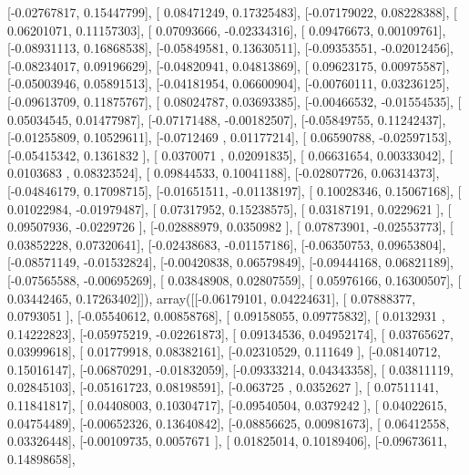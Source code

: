 \documentclass{article}
\begin{document}
       [-0.02767817,  0.15447799],
       [ 0.08471249,  0.17325483],
       [-0.07179022,  0.08228388],
       [ 0.06201071,  0.11157303],
       [ 0.07093666, -0.02334316],
       [ 0.09476673,  0.00109761],
       [-0.08931113,  0.16868538],
       [-0.05849581,  0.13630511],
       [-0.09353551, -0.02012456],
       [-0.08234017,  0.09196629],
       [-0.04820941,  0.04813869],
       [ 0.09623175,  0.00975587],
       [-0.05003946,  0.05891513],
       [-0.04181954,  0.06600904],
       [-0.00760111,  0.03236125],
       [-0.09613709,  0.11875767],
       [ 0.08024787,  0.03693385],
       [-0.00466532, -0.01554535],
       [ 0.05034545,  0.01477987],
       [-0.07171488, -0.00182507],
       [-0.05849755,  0.11242437],
       [-0.01255809,  0.10529611],
       [-0.0712469 ,  0.01177214],
       [ 0.06590788, -0.02597153],
       [-0.05415342,  0.1361832 ],
       [ 0.0370071 ,  0.02091835],
       [ 0.06631654,  0.00333042],
       [ 0.0103683 ,  0.08323524],
       [ 0.09844533,  0.10041188],
       [-0.02807726,  0.06314373],
       [-0.04846179,  0.17098715],
       [-0.01651511, -0.01138197],
       [ 0.10028346,  0.15067168],
       [ 0.01022984, -0.01979487],
       [ 0.07317952,  0.15238575],
       [ 0.03187191,  0.0229621 ],
       [ 0.09507936, -0.0229726 ],
       [-0.02888979,  0.0350982 ],
       [ 0.07873901, -0.02553773],
       [ 0.03852228,  0.07320641],
       [-0.02438683, -0.01157186],
       [-0.06350753,  0.09653804],
       [-0.08571149, -0.01532824],
       [-0.00420838,  0.06579849],
       [-0.09444168,  0.06821189],
       [-0.07565588, -0.00695269],
       [ 0.03848908,  0.02807559],
       [ 0.05976166,  0.16300507],
       [ 0.03442465,  0.17263402]]), array([[-0.06179101,  0.04224631],
       [ 0.07888377,  0.0793051 ],
       [-0.05540612,  0.00858768],
       [ 0.09158055,  0.09775832],
       [ 0.0132931 ,  0.14222823],
       [-0.05975219, -0.02261873],
       [ 0.09134536,  0.04952174],
       [ 0.03765627,  0.03999618],
       [ 0.01779918,  0.08382161],
       [-0.02310529,  0.111649  ],
       [-0.08140712,  0.15016147],
       [-0.06870291, -0.01832059],
       [-0.09333214,  0.04343358],
       [ 0.03811119,  0.02845103],
       [-0.05161723,  0.08198591],
       [-0.063725  ,  0.0352627 ],
       [ 0.07511141,  0.11841817],
       [ 0.04408003,  0.10304717],
       [-0.09540504,  0.0379242 ],
       [ 0.04022615,  0.04754489],
       [-0.00652326,  0.13640842],
       [-0.08856625,  0.00981673],
       [ 0.06412558,  0.03326448],
       [-0.00109735,  0.0057671 ],
       [ 0.01825014,  0.10189406],
       [-0.09673611,  0.14898658],
\end{document}

